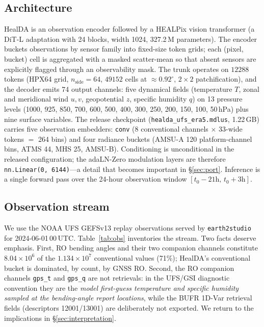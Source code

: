 \documentclass[twocolumn,11pt]{article}
\begin{document}
\subsection{Architecture}
HealDA \citep{gupta2026healda} is an observation encoder followed by a
HEALPix vision transformer (a DiT-L adaptation with 24 blocks, width
1024, 327.2\,M parameters). The encoder buckets observations by sensor
family into fixed-size token grids; each (pixel, bucket) cell is
aggregated with a masked scatter-mean so that absent sensors are
explicitly flagged through an observability mask. The trunk operates
on $12288$ tokens (HPX64 grid, $n_{\mathrm{side}}=64$, $49152$ cells
at $\approx0.92^{\circ}$, $2\times2$ patchification), and the decoder
emits 74 output channels: five dynamical fields (temperature $T$,
zonal and meridional wind $u,v$, geopotential $z$, specific humidity
$q$) on 13 pressure levels (1000, 925, 850, 700, 600, 500, 400, 300,
250, 200, 150, 100, 50\,hPa) plus nine surface variables. The release
checkpoint (\texttt{healda\_ufs\_era5.mdlus}, 1.22\,GB) carries five
observation embedders: \texttt{conv} (8 conventional channels
$\times$ 33-wide tokens $=$ 264 bins) and four radiance buckets
(AMSU-A 120 platform-channel bins, ATMS 44, MHS 25, AMSU-B).
Conditioning is unconditional in the released configuration; the
adaLN-Zero modulation layers are therefore
\texttt{nn.Linear(0, 6144)}---a detail that becomes important in
\S\ref{sec:port}. Inference is a single forward pass over the
24-hour observation window $[t_0-21\mathrm{h},\,t_0+3\mathrm{h}]$.

\subsection{Observation stream}
We use the NOAA UFS GEFSv13 replay observations served by
\texttt{earth2studio} \citep{earth2studio} for
2024-06-01\,00\,UTC. Table~\ref{tab:obs} inventories the stream. Two
facts deserve emphasis. First, RO bending angles and their two
companion channels constitute $8.04\times10^{6}$ of the
$1.134\times10^{7}$ conventional values (71\%); HealDA's conventional
bucket is dominated, by count, by GNSS RO. Second, the RO companion
channels \texttt{gps\_t} and \texttt{gps\_q} are not retrievals:
in the UFS/GSI diagnostic convention they are the
\emph{model first-guess temperature and specific humidity sampled at
the bending-angle report locations}, while the BUFR 1D-Var retrieval
fields (descriptors 12001/13001) are deliberately not exported. We
return to the implications in \S\ref{sec:interpretation}.
\end{document}
